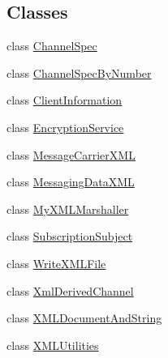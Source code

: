 \subsection*{Classes}
\begin{DoxyCompactItemize}
\item 
class \hyperlink{classgov_1_1fnal_1_1ppd_1_1dd_1_1xml_1_1ChannelSpec}{Channel\-Spec}
\item 
class \hyperlink{classgov_1_1fnal_1_1ppd_1_1dd_1_1xml_1_1ChannelSpecByNumber}{Channel\-Spec\-By\-Number}
\item 
class \hyperlink{classgov_1_1fnal_1_1ppd_1_1dd_1_1xml_1_1ClientInformation}{Client\-Information}
\item 
class \hyperlink{classgov_1_1fnal_1_1ppd_1_1dd_1_1xml_1_1EncryptionService}{Encryption\-Service}
\item 
class \hyperlink{classgov_1_1fnal_1_1ppd_1_1dd_1_1xml_1_1MessageCarrierXML}{Message\-Carrier\-X\-M\-L}
\item 
class \hyperlink{classgov_1_1fnal_1_1ppd_1_1dd_1_1xml_1_1MessagingDataXML}{Messaging\-Data\-X\-M\-L}
\item 
class \hyperlink{classgov_1_1fnal_1_1ppd_1_1dd_1_1xml_1_1MyXMLMarshaller}{My\-X\-M\-L\-Marshaller}
\item 
class \hyperlink{classgov_1_1fnal_1_1ppd_1_1dd_1_1xml_1_1SubscriptionSubject}{Subscription\-Subject}
\item 
class \hyperlink{classgov_1_1fnal_1_1ppd_1_1dd_1_1xml_1_1WriteXMLFile}{Write\-X\-M\-L\-File}
\item 
class \hyperlink{classgov_1_1fnal_1_1ppd_1_1dd_1_1xml_1_1XmlDerivedChannel}{Xml\-Derived\-Channel}
\item 
class \hyperlink{classgov_1_1fnal_1_1ppd_1_1dd_1_1xml_1_1XMLDocumentAndString}{X\-M\-L\-Document\-And\-String}
\item 
class \hyperlink{classgov_1_1fnal_1_1ppd_1_1dd_1_1xml_1_1XMLUtilities}{X\-M\-L\-Utilities}
\end{DoxyCompactItemize}
